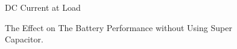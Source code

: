 \documentclass[conference]{IEEEtran}
\begin{document}
\begin{figure}[htbp]
	
	
	
	
	\caption{ DC Current at Load}
	\label{DC ccurrent at load}
	
\end{figure}

\begin{figure}[htbp]
	
	
	
	
	\caption{The Effect on The Battery Performance without Using Super Capacitor.}
	\label{The effect on the battery performance without using super capacitor.}
	
\end{figure}
\end{document}
